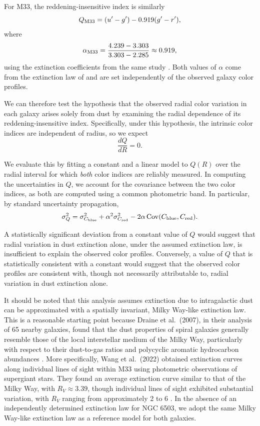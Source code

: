 For M33, the reddening-insensitive index is similarly
\begin{equation}
    Q_{\rm M33} = (u'-g') - 0.919(g'-r'),
\end{equation}
where
\begin{equation}
    \alpha_{\rm M33}
    = \frac{4.239-3.303}{3.303-2.285}
    \approx 0.919,
\end{equation}
using the extinction coefficients from the same study \cite{Schlafly2011}. Both values of $\alpha$ come from the extinction law of \citet{Fitzpatrick1999} and are set independently of the observed galaxy color profiles.

We can therefore test the hypothesis that the observed radial color variation in each galaxy arises solely from dust by examining the radial dependence of its reddening-insensitive index. Specifically, under this hypothesis, the intrinsic color indices are independent of radius, so we expect
\begin{equation}
    \frac{dQ}{dR} = 0.
\end{equation}

We evaluate this by fitting a constant and a linear model to $Q(R)$ over the radial interval for which \textit{both} color indices are reliably measured. In computing the uncertainties in $Q$, we account for the covariance between the two color indices, as both are computed using a common photometric band. In particular, by standard uncertainty propagation,
\begin{equation}
    \sigma_Q^2 =
    \sigma_{C_{\rm blue}}^2
    + \alpha^2 \sigma_{C_{\rm red}}^2
    - 2\alpha\,{\rm Cov}(C_{\rm blue},C_{\rm red}).
\end{equation}

A statistically significant deviation from a constant value of $Q$ would suggest that radial variation in dust extinction alone, under the assumed extinction law, is insufficient to explain the observed color profiles. Conversely, a value of $Q$ that is statistically consistent with a constant would suggest that the observed color profiles are consistent with, though not necessarily attributable to, radial variation in dust extinction alone.

It should be noted that this analysis assumes extinction due to intragalactic dust can be approximated with a spatially invariant, Milky Way-like extinction law. This is a reasonable starting point because Draine et al.\ (2007), in their analysis of 65 nearby galaxies, found that the dust properties of spiral galaxies generally resemble those of the local interstellar medium of the Milky Way, particularly with respect to their dust-to-gas ratios and polycyclic aromatic hydrocarbon abundances \cite{Draine2007}. More specifically, Wang et al.\ (2022) obtained extinction curves along individual lines of sight within M33 using photometric observations of supergiant stars. They found an average extinction curve similar to that of the Milky Way, with $R_V \approx 3.39$, though individual lines of sight exhibited substantial variation, with $R_V$ ranging from approximately 2 to 6 \cite{Wang2022}. In the absence of an independently determined extinction law for NGC 6503, we adopt the same Milky Way-like extinction law as a reference model for both galaxies.

